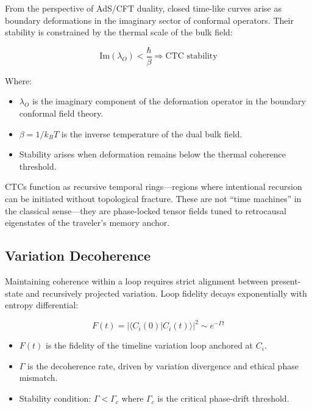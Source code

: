 \documentclass{article}
\theoremstyle{plain}
\theoremstyle{claimstyle}
\begin{document}
From the perspective of AdS/CFT duality, closed time-like curves arise as boundary deformations in the imaginary sector of conformal operators. Their stability is constrained by the thermal scale of the bulk field:

\begin{equation}
\text{Im}(\lambda_O) < \frac{\hbar}{\beta}
\Rightarrow \text{CTC stability}
\end{equation}

Where:
\begin{itemize}
  \item \(\lambda_O\) is the imaginary component of the deformation operator in the boundary conformal field theory.
  \item \(\beta = 1/k_B T\) is the inverse temperature of the dual bulk field.
  \item Stability arises when deformation remains below the thermal coherence threshold.
\end{itemize}

CTCs function as recursive temporal rings—regions where intentional recursion can be initiated without topological fracture. These are not “time machines” in the classical sense—they are phase-locked tensor fields tuned to retrocausal eigenstates of the traveler’s memory anchor.

\subsection{Variation Decoherence}

Maintaining coherence within a loop requires strict alignment between present-state and recursively projected variation. Loop fidelity decays exponentially with entropy differential:

\begin{equation}
F(t) = |\langle C_i(0) | C_i(t) \rangle|^2 \sim e^{-\Gamma t}
\end{equation}

\begin{itemize}
  \item \(F(t)\) is the fidelity of the timeline variation loop anchored at \(C_i\).
  \item \(\Gamma\) is the decoherence rate, driven by variation divergence and ethical phase mismatch.
  \item Stability condition: \(\Gamma < \Gamma_c\) where \(\Gamma_c\) is the critical phase-drift threshold.
\end{itemize}
\end{document}
